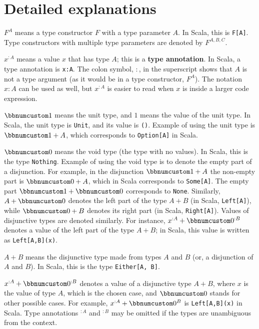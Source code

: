 \section{Detailed explanations}

$F^{A}$ means a type constructor $F$ with a type parameter $A$.
In Scala, this is \lstinline!F[A]!. Type constructors with multiple
type parameters are denoted by $F^{A,B,C}$.

$x^{:A}$ means a value $x$ that has type $A$; this is a \textbf{type
annotation}. In Scala, a type annotation is \lstinline!x:A!. The
colon symbol, $:$, in the superscript shows that $A$ is not a type
argument (as it would be in a type constructor, $F^{A}$). The notation
$x:A$ can be used as well, but $x^{:A}$ is easier to read when $x$
is inside a larger code expression. 

$\bbnum 1$ means the unit type, and $1$ means
the value of the unit type. In Scala, the unit type is \lstinline!Unit!,
and its value is \lstinline!()!. Example of using the unit type is
$\bbnum 1+A$, which corresponds to \lstinline!Option[A]! in Scala.

$\bbnum 0$ means the void type (the type with no
values). In Scala, this is the type \lstinline!Nothing!. Example
of using the void type is to denote the empty part of a disjunction.
For example, in the disjunction $\bbnum 1+A$ the non-empty part is
$\bbnum 0+A$, which in Scala corresponds to \lstinline!Some[A]!.
The empty part $\bbnum 1+\bbnum 0$ corresponds to \lstinline!None!.
Similarly, $A+\bbnum 0$ denotes the left part of the type $A+B$
(in Scala, \lstinline!Left[A]!), while $\bbnum 0+B$ denotes its
right part (in Scala, \lstinline!Right[A]!). Values of disjunctive
types are denoted similarly. For instance, $x^{:A}+\bbnum 0^{:B}$
denotes a value of the left part of the type $A+B$; in Scala, this
value is written as \lstinline!Left[A,B](x)!.

$A+B$ means the disjunctive type made from types $A$ and $B$ (or,
a disjunction of $A$ and $B$). In Scala, this is the type \texttt{}\lstinline!Either[A, B]!.

$x^{:A}+\bbnum 0^{:B}$ denotes a value of a disjunctive type $A+B$,
where $x$ is the value of type $A$, which is the chosen case, and
$\bbnum 0$ stands for other possible cases. For example, $x^{:A}+\bbnum 0^{B}$
is \lstinline!Left[A,B](x)! in Scala. Type annotations $^{:A}$ and
$^{:B}$ may be omitted if the types are unambiguous from the context.

